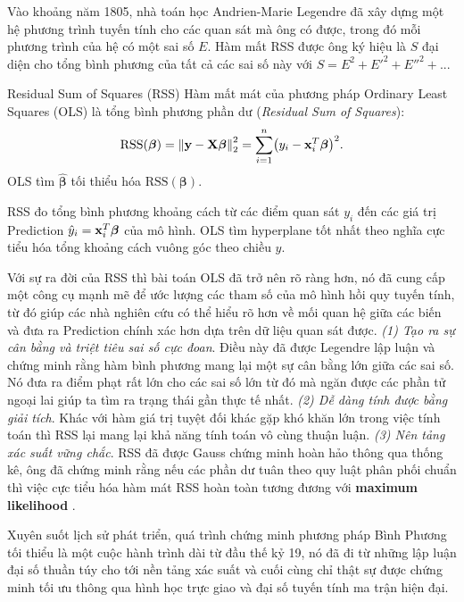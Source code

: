 Vào khoảng năm 1805, nhà toán học Andrien-Marie Legendre đã xây dựng một hệ phương trình tuyến tính cho các quan sát mà ông có được, trong đó mỗi phương trình của hệ có một sai số $E$. Hàm mất RSS được ông ký hiệu là $S$ đại diện cho tổng bình phương của tất cả các sai số này với $S = E^2 + E'^2 + E''^2 + ...$ \cite{plackett1972}
\begin{mydef}{Residual Sum of Squares (RSS)}{}
Hàm mất mát của phương pháp Ordinary Least Squares (OLS) là tổng bình phương
phần dư (\textit{Residual Sum of Squares}):
\[
    \mathrm{RSS}(\boldsymbol{\beta})
    = \left\lVert\mathbf{y} - \mathbf{X}\boldsymbol{\beta}\right\rVert_2^2
    = \sum_{i=1}^n \bigl(y_i - \mathbf{x}_i^T\boldsymbol{\beta}\bigr)^2.
\]
OLS tìm $\hat{\boldsymbol{\beta}}$ tối thiểu hóa $\mathrm{RSS}(\boldsymbol{\beta})$.
\end{mydef}

\begin{note}
RSS đo tổng bình phương khoảng cách từ các điểm quan sát $y_i$ đến các giá trị
Prediction $\hat{y}_i = \mathbf{x}_i^T\boldsymbol{\beta}$ của mô hình. OLS tìm
hyperplane tốt nhất theo nghĩa cực tiểu hóa tổng khoảng cách vuông góc theo
chiều $y$.
\end{note}

Với sự ra đời của RSS thì bài toán OLS đã trở nên rõ ràng hơn, nó đã cung cấp một công cụ mạnh mẽ để ước lượng các tham số của mô hình hồi quy tuyến tính, từ đó giúp các nhà nghiên cứu có thể hiểu rõ hơn về mối quan hệ giữa các biến và đưa ra Prediction chính xác hơn dựa trên dữ liệu quan sát được. \textit{(1) Tạo ra sự cân bằng và triệt tiêu sai số cực đoan}. Điều này đã được Legendre lập luận và chứng minh rằng hàm bình phương mang lại một sự cân bằng lớn giữa các sai số. Nó đưa ra điểm phạt rất lớn cho các sai số lớn từ đó mà ngăn được các phần tử ngoại lai giúp ta tìm ra trạng thái gần thực tế nhất. \textit{(2) Dễ dàng tính được bằng giải tích}. Khác với hàm giá trị tuyệt đối khác gặp khó khăn lớn trong việc tính toán thì RSS lại mang lại khả năng tính toán vô cùng thuận luận. \textit{(3) Nên tảng xác suất vững chắc}. RSS đã được Gauss chứng minh hoàn hảo thông qua thống kê, ông đã chứng minh rằng nếu các phần dư tuân theo quy luật phân phối chuẩn thì việc cực tiểu hóa hàm mát RSS hoàn toàn tương đương với \textbf{maximum likelihood} \cite{plackett1972}.

Xuyên suốt lịch sử phát triển, quá trình chứng minh phương pháp Bình Phương tối thiểu là một cuộc hành trình dài từ đầu thế kỷ 19, nó đã đi từ những lập luận đại số thuần túy cho tới nền tảng xác suất và cuối cùng chỉ thật sự được chứng minh tối ưu thông qua hình học trực giao và đại số tuyến tính ma trận hiện đại.

